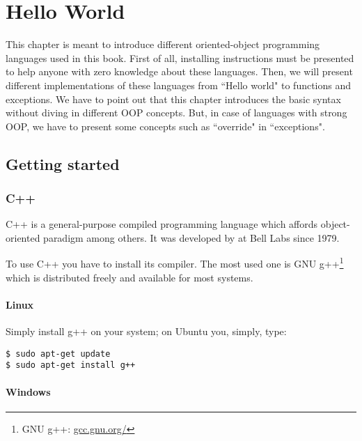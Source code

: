 \documentclass{KodeBook}
\begin{document}
\fi

\chapter{Hello World}

\begin{introduction}
	This chapter is meant to introduce different oriented-object programming languages used in this book. 
	First of all, installing instructions must be presented to help anyone with zero knowledge about these languages. 
	Then, we will present different implementations of these languages from ``Hello world" to functions and exceptions. 
	We have to point out that this chapter introduces the basic syntax without diving in different OOP concepts.
	But, in case of languages with strong OOP, we have to present some concepts such as ``override" in ``exceptions".
\end{introduction}


\section{Getting started}

\subsection{C++}

C++ is a general-purpose compiled programming language which affords object-oriented paradigm among others. 
It was developed by  at Bell Labs since 1979.

To use C++ you have to install its compiler. 
The most used one is GNU g++\footnote{GNU g++: \url{gcc.gnu.org/}} which is distributed freely and available for most systems.

\subsubsection{Linux}
Simply install g++ on your system; on Ubuntu you, simply, type:
\begin{lstlisting}[style=shellStyle]
$ sudo apt-get update
$ sudo apt-get install g++
\end{lstlisting}

\subsubsection{Windows}
\end{document}
